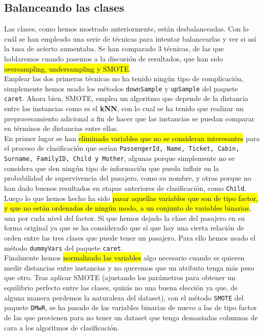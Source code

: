 \documentclass[10pt,a4paper]{article}
\newcommand{\emp}[1]{\sethlcolor{light-yellow}\hl{#1}} %
\newcommand{\code}[1]{\textcolor{rblue}{\texttt{#1}}} %
\begin{document}
\subsection{Balanceando las clases}

Las clases, como hemos mostrado anteriormente, están desbalanceadas. Con lo cuál se han empleado una serie de técnicas para intentar balancearlas y ver si así la tasa de acierto aumentaba. Se han comparado 3 técnicas, de las que hablaremos cuando pasemos a la discusión de resultados, que han sido \emp{oversampling, undersampling y SMOTE}.\\

Emplear las dos primeras técnicas no ha tenido ningún tipo de complicación, simplemente hemos usado los métodos \code{downSample} y \code{upSample} del paquete \code{caret}. Ahora bien, SMOTE, emplea un algoritmo que depende de la distancia entre las instancias como es el \textbf{kNN}, con lo cual se ha tenido que realizar un preprocesamiento adicional a fin de hacer que las instancias se puedan comparar en términos de distancias entre ellas.\\

En primer lugar se han \emp{eliminado variables que no se consideran interesantes} para el proceso de clasificación que serían \code{PassengerId, Name, Ticket, Cabin, Surname, FamilyID, Child y Mother}, algunas porque simplemente no se considera que den ningún tipo de información que pueda influir en la probabilidad de supervivencia del pasajero, como su nombre, y otras porque no han dado buenos resultados en etapas anteriores de clasificación, como \code{Child}.\\

Luego lo que hemos hecho ha sido \emp{pasar aquellas variables que son de tipo factor, y que no están ordenadas de ningún modo, a un conjunto de variables binarias}, una por cada nivel del factor. Sí que hemos dejado la clase del pasajero en su forma original ya que se ha considerado que sí que hay una cierta relación de orden entre las tres clases que puede tener un pasajero. Para ello hemos usado el método \code{dummyVars} del paquete \code{caret}.\\

Finalmente hemos \emp{normalizado las variables} algo necesario cuando se quieren medir distancias entre instancias y no queremos que un atributo tenga más peso que otro. Tras aplicar SMOTE (ajustando los parámetros para obtener un equilibrio perfecto entre las clases, quizás no una buena elección ya que, de alguna manera perdemos la naturaleza del dataset), con el método \code{SMOTE} del paquete \code{DMwR}, se ha pasado de las variables binarias de nuevo a las de tipo factor de las que provienen para no tener un dataset que tenga demasiadas columnas de cara a los algoritmos de clasificación.
\end{document}
